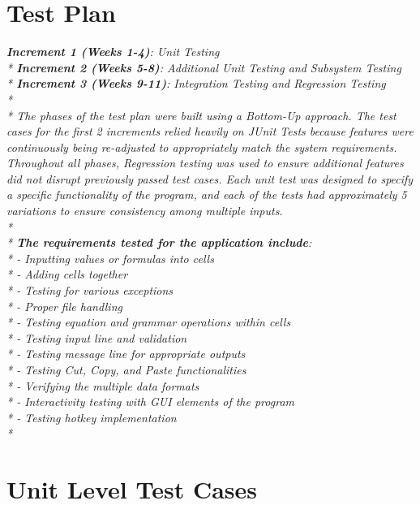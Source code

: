 \documentclass[12pt]{article}
\begin{document}
\section{Test Plan}


{\it
\textbf{Increment 1 (Weeks 1-4)}: Unit Testing \\*
\textbf{Increment 2 (Weeks 5-8)}: Additional Unit Testing and Subsystem Testing \\*
\textbf{Increment 3 (Weeks 9-11)}: Integration Testing and Regression Testing  \\*
\\*
The phases of the test plan were built using a Bottom-Up approach. The test cases for the first 2 increments relied heavily on JUnit Tests because features were continuously being re-adjusted to appropriately match the system requirements. Throughout all phases, Regression testing was used to ensure additional features did not disrupt previously passed test cases. Each unit test was designed to specify a specific functionality of the program, and each of the tests had approximately 5 variations to ensure consistency among multiple inputs. 
\\*
\\*
\textbf{The requirements tested for the application include}:\\*
- Inputting values or formulas into cells \\*
- Adding cells together \\*
- Testing for various exceptions \\*
- Proper file handling \\*
- Testing equation and grammar operations within cells \\*
- Testing input line and validation \\*
- Testing message line for appropriate outputs \\*
- Testing Cut, Copy, and Paste functionalities \\*
- Verifying the multiple data formats \\*
- Interactivity testing with GUI elements of the program \\*
- Testing hotkey implementation \\*

}
\section{Unit Level Test Cases}
\end{document}
